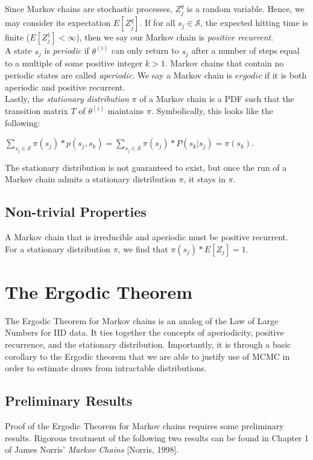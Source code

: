 \documentclass[12pt,twoside]{reedthesis}
\begin{document}
		Since Markov chains are stochastic processes, $Z^{q}_j$ is a random variable. Hence, we may consider its expectation $E[Z^{q}_j]$. If for all $s_j \in \mathcal S$, the expected hitting time is finite ($E[Z^{1}_j] < \infty$), then we say our Markov chain is {\em positive recurrent}. \\
		
		A state $s_j$ is {\em periodic} if $\theta^(i)$ can only return to $s_j$ after a number of steps equal to a multiple of some positive integer $k > 1$. Markov chains that contain no periodic states are called {\em aperiodic}. We say a Markov chain is $ergodic$ if it is both aperiodic and positive recurrent. \\
		
		Lastly, the {\em stationary distribution} $\pi$ of a Markov chain is a PDF such that the transition matrix $T$ of $\theta^{(i)}$ maintains $\pi$. Symbolically, this looks like the following:
		\begin{center}
			$\displaystyle\sum_{s_j \in \mathcal S} \pi(s_j) * p(s_j,s_k) 
			= \displaystyle\sum_{s_j \in \mathcal S} \pi(s_j) * P(s_k | s_j)
			= \pi(s_k)$.
		\end{center}
		The stationary distribution is not guaranteed to exist, but once the run of a Markov chain admits a stationary distribution $\pi$, it stays in $\pi$.
		
		\subsection*{Non-trivial Properties}
		A Markov chain that is irreducible and aperiodic must be positive recurrent. \\
		
		For a stationary distribution $\pi$, we find that $\pi(s_j) * E[Z_j] = 1$.
		
		\section{The Ergodic Theorem}
		The Ergodic Theorem for Markov chains is an analog of the Law of Large Numbers for IID data. It ties together the concepts of aperiodicity, positive recurrence, and the stationary distribution. Importantly, it is through a basic corollary to the Ergodic theorem that we are able to justify use of MCMC in order to estimate draws from intractable distributions.
		\subsection*{Preliminary Results}
		Proof of the Ergodic Theorem for Markov chains requires some preliminary results. Rigorous treatment of the following two results can be found in Chapter 1 of James Norris' {\em Markov Chains} [Norris, 1998]. 
		
\end{document}
